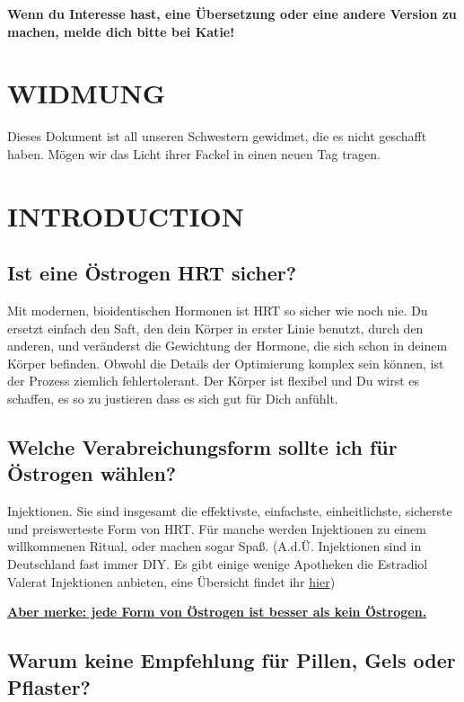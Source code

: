 \documentclass{article}
\begin{document}
\noindent\textbf{Wenn du Interesse hast, eine Übersetzung oder eine andere Version zu machen, melde dich bitte bei Katie!}

\section*{WIDMUNG}

Dieses Dokument ist all unseren Schwestern gewidmet, die es nicht geschafft haben. Mögen wir das Licht ihrer Fackel in einen neuen Tag tragen.
 

\section{INTRODUCTION}

\subsection{Ist eine Östrogen HRT sicher?}

Mit modernen, bioidentischen Hormonen ist HRT so sicher wie noch nie. Du ersetzt einfach den Saft, den dein Körper in erster Linie benutzt, durch den anderen, und veränderst die Gewichtung der Hormone, die sich schon in deinem Körper befinden. Obwohl die Details der Optimierung komplex sein können, ist der Prozess ziemlich fehlertolerant. Der Körper ist flexibel und Du wirst es schaffen, es so zu justieren dass es sich gut für Dich anfühlt.

\subsection{Welche Verabreichungsform sollte ich für Östrogen wählen?}

Injektionen. Sie sind insgesamt die effektivste, einfachste, einheitlichste, sicherste und preiswerteste Form von HRT. Für manche werden Injektionen zu einem willkommenen Ritual, oder machen sogar Spaß. (A.d.Ü. Injektionen sind in Deutschland fast immer DIY. Es gibt einige wenige Apotheken die Estradiol Valerat Injektionen anbieten, eine Übersicht findet ihr \href{https://transdb.de/search?type=pharmacy&offers=eInjection}{hier})

\noindent\underline{\textbf{Aber merke: jede Form von Östrogen ist besser als kein Östrogen.}}

\subsection{Warum keine Empfehlung für Pillen, Gels oder Pflaster?}
\end{document}
